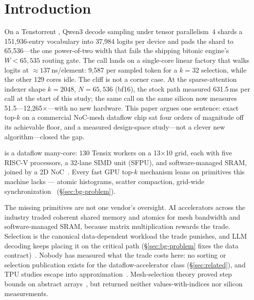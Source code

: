 \section{Introduction}
\label{sec:intro}

On a
Tenstorrent \bh \pca, Qwen3 decode sampling under tensor parallelism~4 shards
a 151{,}936-entry vocabulary into 37{,}984 logits per device and pads the
shard to 65{,}536---the one power-of-two width that fails the shipping
bitonic engine's $W{<}65{,}535$ routing gate. The call lands on a single-core
linear factory that walks logits at ${\approx}137$\,ns/element: 9{,}587\us
per sampled token for a $k{=}32$ selection, while the other 129 cores idle.
The cliff is not a corner case. At the sparse-attention indexer shape
$k{=}2048$, $N{=}65{,}536$ (bf16), the stock \ttnntopk path measured
631.5\,ms per call at the start of this study; the same call on the same
silicon now measures 51.5\us---12{,}265$\times$---with no new hardware. This
paper argues one sentence: exact top-$k$ on a commercial NoC-mesh dataflow
chip sat four orders of magnitude off its achievable floor, and a measured
design-space study---not a clever new algorithm---closed the gap.

\bh is a dataflow many-core: 130 Tensix workers on a 13$\times$10 grid, each
with five RISC-V processors, a 32-lane SIMD unit (SFPU), and software-managed
SRAM, joined by a 2D NoC~\cite{vasiljevic2024blackhole}. Every fast GPU
top-$k$ mechanism leans on primitives this machine lacks --- atomic
histograms, scatter compaction, grid-wide
synchronization~\cite{alabi2012kselection,gaihre2021drtopk,li2024radik}
(\S\ref{sec:bg-problem}).

The missing primitives are not one vendor's oversight. AI accelerators
across the industry traded coherent shared memory and atomics for mesh
bandwidth and software-managed SRAM, because matrix multiplication rewards
the trade. Selection is the canonical data-dependent workload the trade
punishes, and LLM decoding keeps placing it on the critical path
(\S\ref{sec:bg-problem} fixes the data
contract)~\cite{fan2018topk,deepseekv32,gvr2026,shazeer2017moe}. Nobody
has measured what the trade costs here: no sorting or selection
publication exists for the dataflow-accelerator class
(\S\ref{sec:related}), and TPU studies escape into
approximation~\cite{chern2022tpuknn,twostage2025}. Mesh-selection theory
proved step bounds on abstract
arrays~\cite{krizanc1992optimal,krizanc1993fast}, but returned neither
values-with-indices nor silicon measurements.

